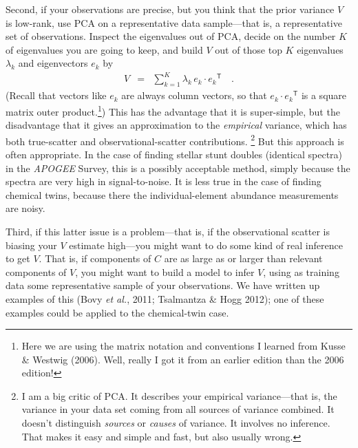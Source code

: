 \documentclass[12pt,letterpaper]{article}
\newcommand{\foreign}[1]{\textsl{#1}}
\newcommand{\project}[1]{\textsl{#1}}
\newcommand{\acronym}[1]{{\small{#1}}}
\newcommand{\etal}{\foreign{et al.}}
\newcommand{\tra}[1]{{#1}^{\mathsf{T}}}
\begin{document}
Second, if your observations are precise, but you think that the prior
variance $V$ is low-rank, use \acronym{PCA} on a representative data
sample---that is, a representative set of observations. Inspect the
eigenvalues out of \acronym{PCA}, decide on the number $K$ of eigenvalues
you are going to keep, and build
$V$ out of those top $K$ eigenvalues $\lambda_k$ and eigenvectors $e_k$ by
\begin{eqnarray}
  V &=& \sum_{k=1}^K \lambda_k\,e_k\cdot\tra{e_k}
\quad .
\end{eqnarray}
(Recall that vectors like $e_k$ are always column vectors, so that
$e_k\cdot\tra{e_k}$ is a square matrix outer product.\footnote{Here we
  are using the matrix notation and conventions I learned from Kusse
  \& Westwig (2006). Well, really I got it from an earlier edition than the 2006 edition!})
This has the advantage that it is super-simple, but the disadvantage
that it gives an approximation to the \emph{empirical} variance, which
has both true-scatter and observational-scatter contributions.%
\footnote{I am a big critic of \acronym{PCA}. It describes your
  empirical variance---that is, the variance in your data set coming
  from all sources of variance combined. It doesn't distinguish
  \emph{sources} or \emph{causes} of variance. It involves no
  inference. That makes it easy and simple and fast, but also usually
  wrong.}
But this approach is often
appropriate. In the case of finding stellar stunt doubles (identical
spectra) in the \project{\acronym{APOGEE}} Survey, this is a possibly acceptable
method, simply because the spectra are very high in
signal-to-noise. It is less true in the case of finding chemical
twins, because there the individual-element abundance measurements are
noisy.

Third, if this latter issue is a problem---that is, if the
observational scatter is biasing your $V$ estimate high---you might
want to do some kind of real inference to get $V$. That is, if
components of $C$ are as large as or larger than relevant components
of $V$, you might want to build a model to infer $V$, using as
training data some representative sample of your observations. We have
written up examples of this (Bovy \etal, 2011; Tsalmantza \& Hogg 2012);
one of these examples could be applied to the chemical-twin case.
\end{document}

